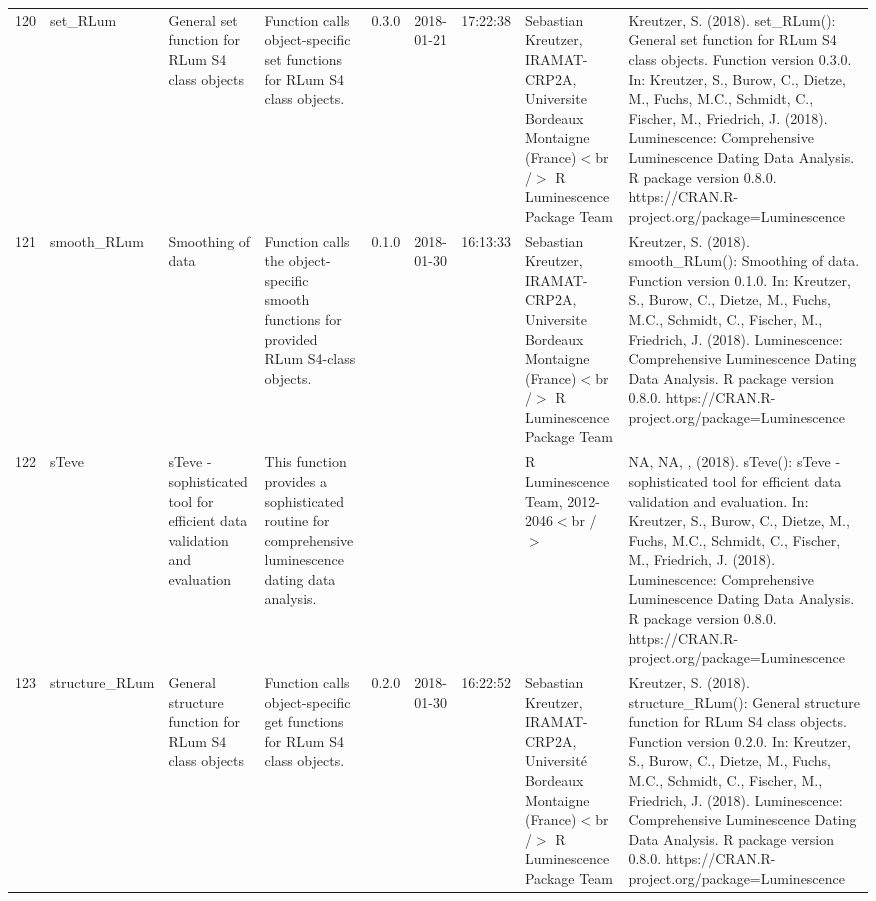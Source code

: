 \begin{table}[ht]
\begin{tabular}{rllllllll}
 \\ 
  120 & set\_RLum & General set function for RLum S4 class objects & Function calls object-specific set functions for RLum S4 class objects. & 0.3.0 & 2018-01-21 & 17:22:38
 & Sebastian Kreutzer, IRAMAT-CRP2A, Universite Bordeaux Montaigne (France)$<$br /$>$  R Luminescence Package Team & Kreutzer, S. (2018). set\_RLum(): General set function for RLum S4 class objects. Function version 0.3.0. In: Kreutzer, S., Burow, C., Dietze, M., Fuchs, M.C., Schmidt, C., Fischer, M., Friedrich, J. (2018). Luminescence: Comprehensive Luminescence Dating Data Analysis. R package version 0.8.0. https://CRAN.R-project.org/package=Luminescence
 \\ 
  121 & smooth\_RLum & Smoothing of data & Function calls the object-specific smooth functions for provided RLum S4-class objects. & 0.1.0 & 2018-01-30 & 16:13:33
 & Sebastian Kreutzer, IRAMAT-CRP2A, Universite Bordeaux Montaigne (France)$<$br /$>$  R Luminescence Package Team & Kreutzer, S. (2018). smooth\_RLum(): Smoothing of data. Function version 0.1.0. In: Kreutzer, S., Burow, C., Dietze, M., Fuchs, M.C., Schmidt, C., Fischer, M., Friedrich, J. (2018). Luminescence: Comprehensive Luminescence Dating Data Analysis. R package version 0.8.0. https://CRAN.R-project.org/package=Luminescence
 \\ 
  122 & sTeve & sTeve - sophisticated tool for efficient data validation and evaluation & This function provides a sophisticated routine for comprehensive luminescence dating data analysis. &  &  &  & R Luminescence Team, 2012-2046$<$br /$>$ & NA, NA, ,  (2018). sTeve(): sTeve - sophisticated tool for efficient data validation and evaluation. In: Kreutzer, S., Burow, C., Dietze, M., Fuchs, M.C., Schmidt, C., Fischer, M., Friedrich, J. (2018). Luminescence: Comprehensive Luminescence Dating Data Analysis. R package version 0.8.0. https://CRAN.R-project.org/package=Luminescence
 \\ 
  123 & structure\_RLum & General structure function for RLum S4 class objects & Function calls object-specific get functions for RLum S4 class objects. & 0.2.0 & 2018-01-30 & 16:22:52
 & Sebastian Kreutzer, IRAMAT-CRP2A, Université Bordeaux Montaigne (France)$<$br /$>$  R Luminescence Package Team & Kreutzer, S. (2018). structure\_RLum(): General structure function for RLum S4 class objects. Function version 0.2.0. In: Kreutzer, S., Burow, C., Dietze, M., Fuchs, M.C., Schmidt, C., Fischer, M., Friedrich, J. (2018). Luminescence: Comprehensive Luminescence Dating Data Analysis. R package version 0.8.0. https://CRAN.R-project.org/package=Luminescence

\end{tabular}
\end{table}
